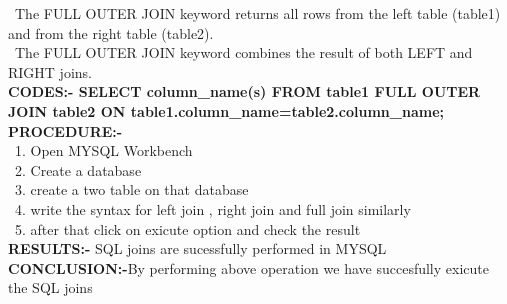 \documentclass[a4paper,0pt]{article}
\begin{document}
\ The FULL OUTER JOIN keyword returns all rows from the left table (table1) and from the right table (table2).\\[1mm]
\ The FULL OUTER JOIN keyword combines the result of both LEFT and RIGHT joins.\\[2mm]
\textbf{CODES:- SELECT column\_name(s)
FROM table1
FULL OUTER JOIN table2
ON table1.column\_name=table2.column\_name;}\\[5mm]
\newpage
\textbf{PROCEDURE:-}\\[2MM]
\ 1. Open MYSQL Workbench\\[2mm]
\ 2. Create a database\\[2mm]
\ 3. create a  two table on that database\\[2mm]
\ 4. write the syntax for left join , right join and full join similarly \\[2mm]
\ 5. after that click on exicute option and check the result\\[5mm]
\textbf{RESULTS:-} SQL joins are sucessfully performed in MYSQL\\[5MM]
\textbf{CONCLUSION:-}By performing above  operation we have succesfully exicute the SQL joins
\end{document}
